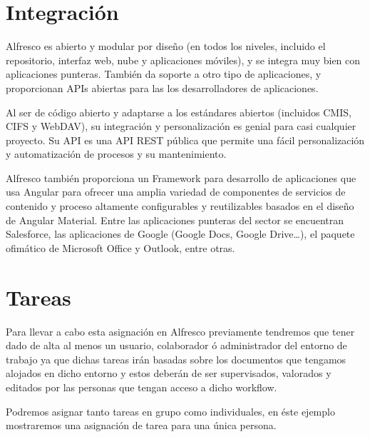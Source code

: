 \documentclass{article}
\begin{document}
\section{Integración}

Alfresco es abierto y modular por diseño (en todos los niveles, incluido el repositorio, interfaz web, nube y aplicaciones móviles), y se integra muy bien con aplicaciones punteras. También da soporte a otro tipo de aplicaciones, y proporcionan APIs abiertas para las los desarrolladores de aplicaciones.

Al ser de código abierto y adaptarse a los estándares abiertos (incluidos CMIS, CIFS y WebDAV), su integración y personalización es genial para casi cualquier proyecto.  Su API es una API REST pública que permite una fácil personalización y automatización de procesos y su mantenimiento.

Alfresco también proporciona un Framework para desarrollo de aplicaciones que usa Angular para ofrecer una amplia variedad de componentes de servicios de contenido y proceso altamente configurables y reutilizables basados en el diseño de Angular Material.
Entre las aplicaciones punteras del sector se encuentran Salesforce, las aplicaciones de Google (Google Docs, Google Drive…), el paquete ofimático de Microsoft Office y Outlook, entre otras.

\section{Tareas}

Para llevar a cabo esta asignación en Alfresco previamente tendremos que tener dado de alta al menos un usuario, colaborador ó administrador del entorno de trabajo ya que dichas tareas irán basadas sobre los documentos que tengamos alojados en dicho entorno y estos deberán de ser supervisados, valorados y editados por las personas que tengan acceso a dicho workflow.

Podremos asignar tanto tareas en grupo como individuales, en éste ejemplo mostraremos una asignación de tarea para una única persona.
\end{document}
